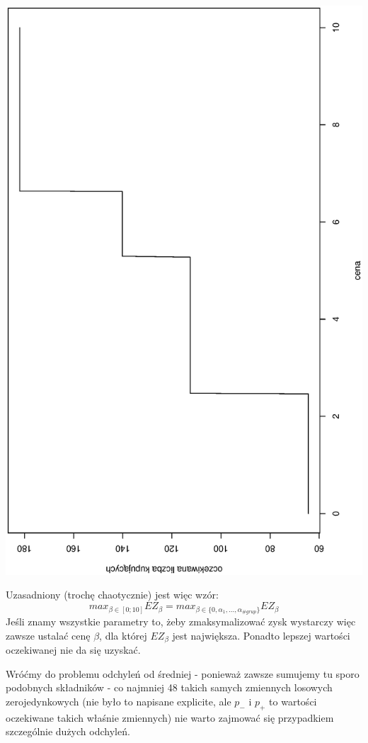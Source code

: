 \documentclass[a4paper,11pt]{article}
\begin{document}
\includegraphics[scale=.4, angle=270]{plateau.eps}

Uzasadniony (trochę chaotycznie) jest więc wzór:
\[
max_{\beta \in [0; 10]}EZ_{\beta} = max_{\beta \in \{0, \alpha_1, ..., \alpha_{\#grup}\}}EZ_{\beta}
\]
Jeśli znamy wszystkie parametry to, żeby zmaksymalizować zysk wystarczy więc zawsze ustalać cenę $\beta$, dla której $EZ_{\beta}$ jest największa. Ponadto lepszej wartości oczekiwanej
nie da się uzyskać.

Wróćmy do problemu odchyleń od średniej - ponieważ zawsze sumujemy tu sporo podobnych składników - co najmniej 48 takich samych zmiennych losowych zerojedynkowych (nie było
to napisane explicite, ale $p_-$ i $p_+$ to wartości oczekiwane takich właśnie
zmiennych) nie warto zajmować się przypadkiem szczególnie dużych odchyleń.
\end{document}
